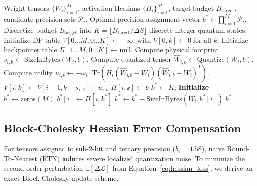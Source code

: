 \documentclass[10pt,twocolumn,letterpaper]{article}
\newcommand{\E}{\mathbb{E}}
\begin{document}
\begin{algorithm}[t]
\caption{Dynamic Programming Knapsack-Aware Allocation}
\label{alg:kac_dp}
\small
\begin{algorithmic}[1]
\Require Weight tensors $\{W_i\}_{i=1}^M$, activation Hessians $\{H_i\}_{i=1}^M$, target budget $B_{\text{target}}$, candidate precision sets $\mathcal{P}_i$.
\Ensure Optimal precision assignment vector $b^* \in \prod_{i=1}^M \mathcal{P}_i$.
\State Discretize budget $B_{\text{target}}$ into $K = \lfloor B_{\text{target}} / \Delta S \rfloor$ discrete integer quantum states.
\State Initialize DP table $V[0 \dots M, 0 \dots K] \gets -\infty$, with $V[0, k] \gets 0$ for all $k$.
\State Initialize backpointer table $\Pi[1 \dots M, 0 \dots K] \gets \text{null}$.
        \State Compute physical footprint $s_{i,b} \gets \text{SizeInBytes}(W_i, b)$.
        \State Compute quantized tensor $\widehat{W}_{i,b} \gets \text{Quantize}(W_i, b)$.
        \State Compute utility $u_{i,b} \gets -\omega_i \cdot \text{Tr}\left( H_i (\widehat{W}_{i,b} - W_i)(\widehat{W}_{i,b} - W_i)^T \right)$.
                \State $V[i, k] \gets V[i-1, k - s_{i,b}] + u_{i,b}$
                \State $\Pi[i, k] \gets b$
            \EndIf
        \EndFor
    \EndFor
\EndFor
\State $k^* \gets K$; \textbf{Initialize} $b^* \gets \text{zeros}(M)$
    \State $b^*[i] \gets \Pi[i, k^*]$
    \State $k^* \gets k^* - \text{SizeInBytes}(W_i, b^*[i])$
\EndFor
\State \Return $b^*$
\end{algorithmic}
\end{algorithm}

\subsection{Block-Cholesky Hessian Error Compensation}
\label{sec:math_cholesky}
For tensors assigned to sub-2-bit and ternary precision ($b_i = 1.58$), naive Round-To-Nearest (RTN) induces severe localized quantization noise. To minimize the second-order perturbation $\E[\Delta \mathcal{L}]$ from Equation~\eqref{eq:hessian_loss}, we derive an exact Block-Cholesky update scheme.
\end{document}
